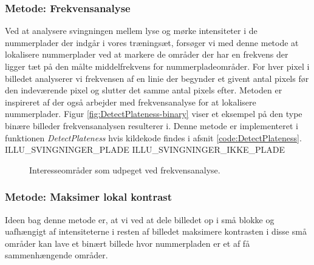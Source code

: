 \subsubsection{Metode: Frekvensanalyse}
\label{sec:DetectPlateness}
Ved at analysere svingningen mellem lyse og mørke intensiteter i de nummerplader der indgår i vores træningsæt, forsøger vi med denne metode at lokalisere nummerplader ved at markere de områder der har en frekvens der ligger tæt på den målte middelfrekvens for nummerpladeområder.  For hver pixel i billedet analyserer vi frekvensen af en linie der begynder et givent antal pixels før den indeværende pixel og slutter det samme antal pixels efter. Metoden er inspireret af \cite{kwas} der også arbejder med frekvensanalyse for at lokalisere nummerplader. Figur \vref{fig:DetectPlateness-binary} viser et eksempel på den type binære billeder frekvensanalysen resulterer i. Denne metode er implementeret i funktionen \textit{DetectPlateness} hvis kildekode findes i afsnit \vref{code:DetectPlateness}.
ILLU\_SVINGNINGER\_PLADE
ILLU\_SVINGNINGER\_IKKE\_PLADE
\begin{figure}[htp]
  \centering
  \caption{Interesseområder som udpeget ved frekvensanalyse.}
  \label{fig:DetectPlateness-binary}
\end{figure}

\subsubsection{Metode: Maksimer lokal kontrast}
Ideen bag denne metode er, at vi ved at dele billedet op i små blokke og uafhængigt af intensiteterne i resten af billedet maksimere kontrasten i disse små områder kan lave et binært billede hvor nummerpladen er et af få sammenhængende områder.

